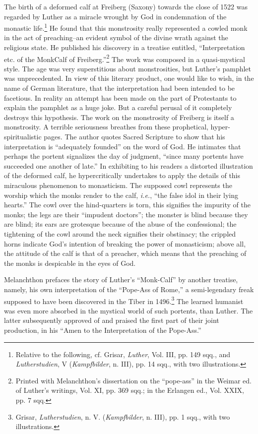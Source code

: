 The birth of a deformed calf at Freiberg (Saxony) towards the
close of 1522 was regarded by Luther as a miracle wrought by God in
condemnation of the monastic life.\footnote
{Relative to the following, cf. Grisar, \textit{Luther}, Vol. III, pp. 149 sqq., and \textit{Lutherstudien},
V (\textit{Kampfbilder}, n. III), pp. 14 sqq., with two illustrations.}
He found that this monstrosity
really represented a cowled monk in the act of preaching--an evident
symbol of the divine wrath against the religious state. He published
his discovery in a treatise entitled, “Interpretation etc. of the MonkCalf
of Freiberg.”\footnote
{Printed with Melanchthon’s dissertation on the “pope-ass” in the Weimar ed. of
Luther’s writings, Vol. XI, pp. 369 sqq.; in the Erlangen ed., Vol. XXIX, pp. 7 sqq.}
The work was composed in a quasi-mystical
style. The age was very superstitious about monstrosities, but Luther’s
pamphlet was unprecedented. In view of this literary product, one
would like to wish, in the name of German literature, that the interpretation
had been intended to be facetious. In reality an attempt
has been made on the part of Protestants to explain the pamphlet
as a huge joke. But a careful perusal of it completely destroys this
hypothesis. The work on the monstrosity of Freiberg is itself a
monstrosity. A terrible seriousness breathes from these prophetical,
hyper-spiritualistic pages. The author quotes Sacred Scripture to
show that his interpretation is “adequately founded” on the word
of God. He intimates that perhaps the portent signalizes the day
of judgment, “since many portents have succeeded one another of
late.” In exhibiting to his readers a distorted illustration of the deformed
calf, he hypercritically undertakes to apply the details of
this miraculous phenomenon to monasticism. The supposed cowl
represents the worship which the monks render to the calf, \textit{i.e.}, “the
false idol in their lying hearts.” The cowl over the hind-quarters
is torn, this signifies the impurity of the monks; the legs are their
“impudent doctors”; the monster is blind because they are blind;
its ears are grotesque because of the abuse of the confessional; the
tightening of the cowl around the neck signifies their obstinacy;
the crippled horns indicate God’s intention of breaking the power
of monasticism; above all, the attitude of the calf is that of a
preacher, which means that the preaching of the monks is despicable
in the eyes of God.

Melanchthon prefaces the story of Luther’s “Monk-Calf” by another treatise,
namely, his own interpretation of the “Pope-Ass of
Rome,” a semi-legendary freak supposed to have been discovered in
the Tiber in 1496.\footnote{Grisar, \textit{Lutherstudien}, n. V. (\textit{Kampfbilder}, n. III), pp. 1 sqq., with two illustrations.}
The learned humanist was even more absorbed
in the mystical world of such portents, than Luther. The latter
subsequently approved of and praised the first part of their joint
production, in his “Amen to the Interpretation of the Pope-Ass.”

